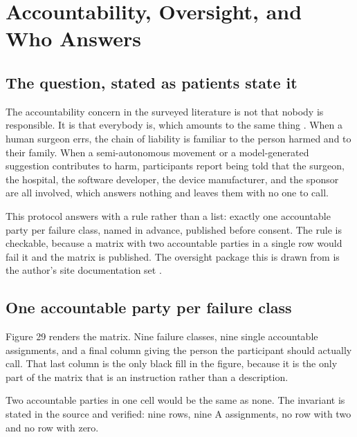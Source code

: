 \section{Accountability, Oversight, and Who Answers}

\subsection{The question, stated as patients state it}

The accountability concern in the surveyed literature is not that nobody is
responsible. It is that everybody is, which amounts to the same thing
\cite{Jauniaux2025, WuSemiAI2026}. When a human surgeon errs, the chain of
liability is familiar to the person harmed and to their family. When a
semi-autonomous movement or a model-generated suggestion contributes to harm,
participants report being told that the surgeon, the hospital, the software
developer, the device manufacturer, and the sponsor are all involved, which
answers nothing and leaves them with no one to call.

This protocol answers with a rule rather than a list: exactly one accountable
party per failure class, named in advance, published before consent. The rule is
checkable, because a matrix with two accountable parties in a single row would
fail it and the matrix is published. The oversight package this is drawn from is
the author's site documentation set \cite{paisitedocpk}.

\subsection{One accountable party per failure class}

Figure 29 renders the matrix. Nine failure classes, nine single accountable
assignments, and a final column giving the person the participant should
actually call. That last column is the only black fill in the figure, because it
is the only part of the matrix that is an instruction rather than a description.

Two accountable parties in one cell would be the same as none. The invariant is
stated in the source and verified: nine rows, nine A assignments, no row with
two and no row with zero.

